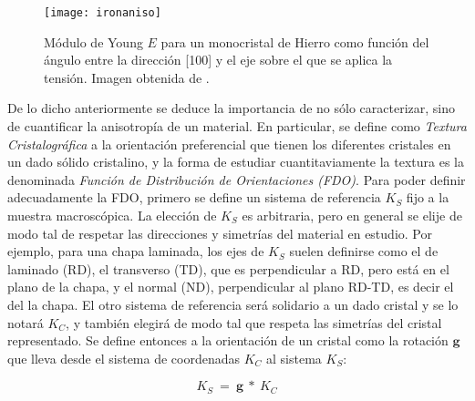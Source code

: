 \begin{figure}[!htb]
  \centering
  \texttt{[image: ironaniso]}
  \caption{Módulo de Young $E$ para un monocristal de Hierro como función del ángulo entre la dirección [100] y el eje sobre el que se aplica la tensión. Imagen obtenida de \cite{randle2000introduction}.}
  \label{fig:ironaniso}
\end{figure}

De lo dicho anteriormente se deduce la importancia de no sólo caracterizar, sino de cuantificar la anisotropía de un material. 
En particular, se define como \textit{Textura Cristalográfica} a la orientación preferencial que tienen los diferentes cristales en un dado sólido cristalino, y la forma de estudiar cuantitaviamente la textura es la denominada \textit{Función de Distribución de Orientaciones (FDO)}.
Para poder definir adecuadamente la FDO, primero se define un sistema de referencia $K_S$ fijo a la muestra macroscópica.
La elección de $K_S$ es arbitraria, pero en general se elije de modo tal de respetar las direcciones y simetrías del material en estudio. 
Por ejemplo, para una chapa laminada, los ejes de $K_S$ suelen definirse como el de laminado (RD), el transverso (TD), que es perpendicular a RD, pero está en el plano de la chapa, y el normal (ND), perpendicular al plano RD-TD, es decir el del la chapa.
El otro sistema de referencia será solidario a un dado cristal y se lo notará $K_C$, y también elegirá de modo tal que respeta las simetrías del cristal representado.
Se define entonces a la orientación de un cristal como la rotación $\mathbf{g}$ que lleva desde el sistema de coordenadas $K_C$ al sistema $K_S$:

\begin{equation}
  K_S \ = \ \mathbf{g} \ * \ K_C
  \label{eq:orientation}
\end{equation}
\noindent

